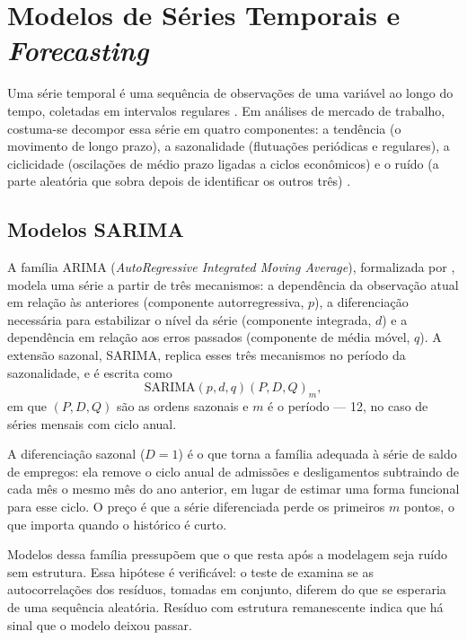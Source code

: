 \section{Modelos de Séries Temporais e \textit{Forecasting}}

Uma série temporal é uma sequência de observações de uma variável ao longo do tempo, coletadas em intervalos regulares \cite{Hyndman2021}. Em análises de mercado de trabalho, costuma-se decompor essa série em quatro componentes: a tendência (o movimento de longo prazo), a sazonalidade (flutuações periódicas e regulares), a ciclicidade (oscilações de médio prazo ligadas a ciclos econômicos) e o ruído (a parte aleatória que sobra depois de identificar os outros três) \cite{Box2015}.

\subsection{Modelos SARIMA}
\label{subsec:sarima}

A família ARIMA (\textit{AutoRegressive Integrated Moving Average}), formalizada por , modela uma série a partir de três mecanismos: a dependência da observação atual em relação às anteriores (componente autorregressiva, $p$), a diferenciação necessária para estabilizar o nível da série (componente integrada, $d$) e a dependência em relação aos erros passados (componente de média móvel, $q$). A extensão sazonal, SARIMA, replica esses três mecanismos no período da sazonalidade, e é escrita como
\begin{equation}
    \text{SARIMA}(p, d, q)(P, D, Q)_m,
\end{equation}
em que $(P, D, Q)$ são as ordens sazonais e $m$ é o período --- 12, no caso de séries mensais com ciclo anual.

A diferenciação sazonal ($D = 1$) é o que torna a família adequada à série de saldo de empregos: ela remove o ciclo anual de admissões e desligamentos subtraindo de cada mês o mesmo mês do ano anterior, em lugar de estimar uma forma funcional para esse ciclo. O preço é que a série diferenciada perde os primeiros $m$ pontos, o que importa quando o histórico é curto.

Modelos dessa família pressupõem que o que resta após a modelagem seja ruído sem estrutura. Essa hipótese é verificável: o teste de  examina se as autocorrelações dos resíduos, tomadas em conjunto, diferem do que se esperaria de uma sequência aleatória. Resíduo com estrutura remanescente indica que há sinal que o modelo deixou passar.

